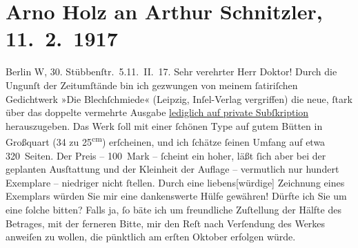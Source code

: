 

               \section[Arno Holz an Arthur Schnitzler, 11. 2. 1917]{ Arno Holz an Arthur Schnitzler, 11. 2. 1917}\nopagebreak{}\rehead{ }\begin{ledgroupsized}[t]{13cm}\normalsize\beginnumbering{} \toendnotes[C]{\smallbreak\pagebreak[2]} 
\pstart
           \raggedleft{}{\pb}Berlin W, 30. Stübbenſtr. 5.\hspace*{1.5em}11. II. 17. \pend
           \pstart\center{}Sehr verehrter Herr Doktor!\pend\pstart
           Durch die Ungunſt der Zeitumſtände bin ich gezwungen von meinem ſatiriſchen
                    Gedichtwerk »Die Blechſchmiede« (Leipzig, Inſel-Verlag vergriffen) die neue, ſtark über das doppelte vermehrte
                    Ausgabe \uline{lediglich auf private Subſkription}
                    herauszugeben. Das Werk ſoll mit einer ſchönen Type auf gutem Bütten in
                    Großquart (34 zu 25\textsuperscript{cm}) erſcheinen, und ich ſchätze
                    ſeinen Umfang auf etwa 320 Seiten. Der Preis – 100 Mark – ſcheint ein hoher,
                    läßt ſich aber bei der geplanten Ausſtattung und der Kleinheit der Auflage –
                    vermutlich nur hundert Exemplare – niedriger nicht ſtellen. Durch eine
                        liebens{[}würdige{]} Zeichnung eines Exemplars würden Sie mir
                    eine dankenswerte Hülfe gewähren! Dürfte ich Sie um eine ſolche bitten? Falls
                    ja, ſo bäte ich um freundliche Zuſtellung der Hälfte des Betrages, mit der
                    ferneren Bitte, mir den Reſt nach Verſendung des Werkes anweiſen zu wollen, die
                    pünktlich am erſten Oktober erfolgen würde.\pend

\end{ledgroupsized}
